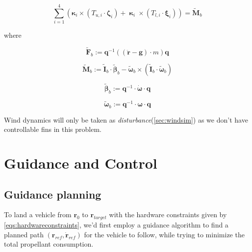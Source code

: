 \documentclass[10pt]{elsarticle}
\begin{document}
\begin{equation} \label{eqs:accIznewton}
\sum\limits_{i=1}^{4}{(\boldsymbol{\kappa}_{i} \times (T_{u,i} \cdot \boldsymbol{\zeta}_{i}) + \boldsymbol{\upkappa}_{i} \times (T_{l,i} \cdot \boldsymbol{\xi}_{i}))} = \tilde{\boldsymbol{M}}_b    
\end{equation}

where 

\begin{equation} \label{eqs:bodyFrameThrusts}
\tilde{\boldsymbol{F}}_b := \boldsymbol{q}^{-1} ((\ddot{\boldsymbol{r}} - \boldsymbol{g}) \cdot m) \boldsymbol{q}    
\end{equation}

\begin{equation} \label{eqs:bodyFrameTorque}
\tilde{\boldsymbol{M}}_b := \tilde{\boldsymbol{I}}_b \cdot \tilde{\boldsymbol{\beta}}_b - \tilde{\boldsymbol{\omega}}_b \times (\tilde{\boldsymbol{I}}_b \cdot \tilde{\boldsymbol{\omega}}_b)   
\end{equation}

\begin{equation} \label{eqs:accQuatBetaDef}
\tilde{\boldsymbol{\beta}}_b := \boldsymbol{q}^{-1} \cdot \dot{\boldsymbol{\omega}} \cdot \boldsymbol{q}
\end{equation}

\begin{equation} \label{eqs:accQuatOmegaDef}
\tilde{\boldsymbol{\omega}}_b := \boldsymbol{q}^{-1} \cdot \boldsymbol{\omega} \cdot \boldsymbol{q}
\end{equation}
\normalsize %

Wind dynamics will only be taken as \textit{disturbance}(\cref{sec:windsim}) as we don't have controllable fins in this problem.

\section{Guidance and Control} \label{sec:gdc}
\subsection{Guidance planning} \label{sec:gdp}

To land a vehicle from $\boldsymbol{r}_0$ to $\boldsymbol{r}_{target}$ with the hardware constraints given by \cref{eqs:hardwareconstraints}, we'd first employ a guidance algorithm to find a planned path $(\boldsymbol{r}_{ref}, \dot{\boldsymbol{r}}_{ref})$ for the vehicle to follow, while trying to minimize the total propellant consumption. 
\end{document}

